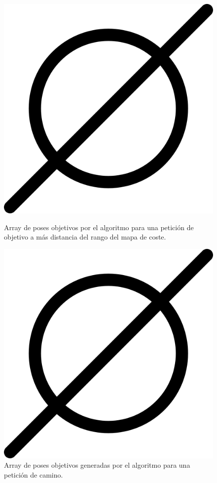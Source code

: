 \begin{figure}[htbp]
  \centering
  \begin{minipage}[b]{0.45\textwidth}
    \centering
    \includegraphics[width=\textwidth]{images/poner_foto.png}
    \caption{Array de poses objetivos por el algoritmo para una petición de objetivo a más distancia del rango del mapa de coste.}
    \label{fig:puntos_intermedios_mas_50m}
  \end{minipage}
  \hfill
  \begin{minipage}[b]{0.45\textwidth}
    \centering
    \includegraphics[width=\textwidth]{images/poner_foto.png}
    \caption{Array de poses objetivos generadas por el algoritmo para una petición de camino.}
    \label{fig:puntos_intermedios_camino}
  \end{minipage}
\end{figure}

